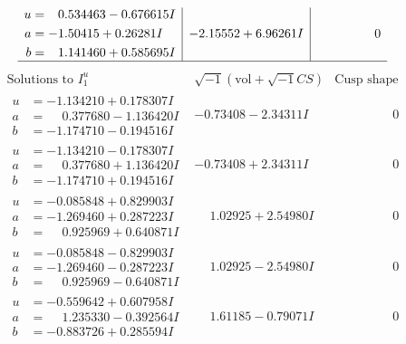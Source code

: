 \documentclass[1p]{elsarticle_modified}
\theoremstyle{definition}
\newcommand{\I}{\sqrt{-1}}
\begin{document}
$$\begin{array}{c|c|c}
\begin{aligned}
u &= \phantom{-}0.534463 - 0.676615 I \\
a &= -1.50415 + 0.26281 I \\
b &= \phantom{-}1.141460 + 0.585695 I\end{aligned}
 & -2.15552 + 6.96261 I & \phantom{-0.000000 } 0\\
 \hline 
 \end{array}$$\newpage$$\begin{array}{c|c|c}  
\text{Solutions to }I^u_{1}& \I (\text{vol} + \sqrt{-1}CS) & \text{Cusp shape}\\
 \hline 
\begin{aligned}
u &= -1.134210 + 0.178307 I \\
a &= \phantom{-}0.377680 - 1.136420 I \\
b &= -1.174710 - 0.194516 I\end{aligned}
 & -0.73408 - 2.34311 I & \phantom{-0.000000 } 0 \\ \hline\begin{aligned}
u &= -1.134210 - 0.178307 I \\
a &= \phantom{-}0.377680 + 1.136420 I \\
b &= -1.174710 + 0.194516 I\end{aligned}
 & -0.73408 + 2.34311 I & \phantom{-0.000000 } 0 \\ \hline\begin{aligned}
u &= -0.085848 + 0.829903 I \\
a &= -1.269460 + 0.287223 I \\
b &= \phantom{-}0.925969 + 0.640871 I\end{aligned}
 & \phantom{-}1.02925 + 2.54980 I & \phantom{-0.000000 } 0 \\ \hline\begin{aligned}
u &= -0.085848 - 0.829903 I \\
a &= -1.269460 - 0.287223 I \\
b &= \phantom{-}0.925969 - 0.640871 I\end{aligned}
 & \phantom{-}1.02925 - 2.54980 I & \phantom{-0.000000 } 0 \\ \hline\begin{aligned}
u &= -0.559642 + 0.607958 I \\
a &= \phantom{-}1.235330 - 0.392564 I \\
b &= -0.883726 + 0.285594 I\end{aligned}
 & \phantom{-}1.61185 - 0.79071 I & \phantom{-0.000000 } 0 \\ \hline\begin{aligned}

\end{aligned}
\end{array}$$
\end{document}
